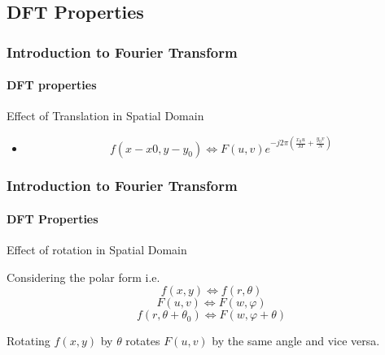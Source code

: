 \documentclass{beamer}
\begin{document}
\subsection{DFT Properties}
\begin{frame}
\frametitle{Introduction to Fourier Transform}
\framesubtitle{DFT properties}
\begin{block}{Effect of Translation in Spatial Domain}
\begin{itemize}
\item [] $$ f(x-x{0}, y-y_{0}) \Leftrightarrow F(u,v)e^{-j2\pi(\frac{x_{0}u}{M} + \frac{y_{0}v}{N})}$$
\end{itemize}
\end{block}
\end{frame}
\begin{frame}
\frametitle{Introduction to Fourier Transform}
\framesubtitle{DFT Properties}
\begin{block}{Effect of rotation in Spatial Domain}
\begin{itemize}
\scriptsize{
\item [] Considering the polar form i.e. 
$$f(x,y)\Leftrightarrow f(r, \theta)$$ 
$$F(u,v)\Leftrightarrow F( w, \varphi)$$
$$f(r, \theta+\theta_{0}) \Leftrightarrow F(w,\varphi+\theta)$$
\item Rotating $f(x,y)$ by $\theta$ rotates $F(u,v)$ by the same angle and vice versa.
}
\end{itemize}
\end{block}
\end{frame}
\end{document}
